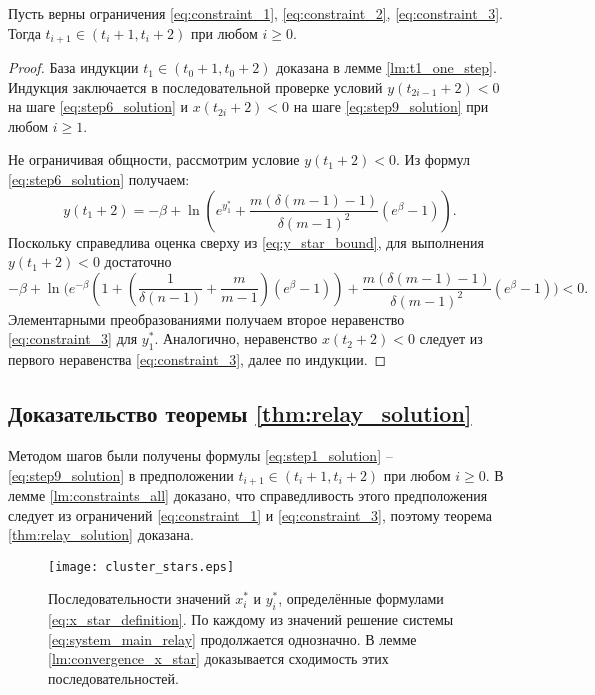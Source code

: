 \begin{lemma}
	\label{lm:constraints_all}
	Пусть верны ограничения \eqref{eq:constraint_1}, \eqref{eq:constraint_2}, \eqref{eq:constraint_3}. Тогда $t_{i + 1} \in (t_i + 1, t_i + 2)$ при любом $i \geqslant 0$.
\end{lemma}
\begin{proof}
	
	База индукции $t_1 \in (t_0 + 1, t_0 + 2)$ доказана в лемме \eqref{lm:t1_one_step}. Индукция заключается в последовательной проверке условий $y(t_{2i - 1} + 2) < 0$ на шаге \eqref{eq:step6_solution} и $x(t_{2i} + 2) < 0$ на шаге \eqref{eq:step9_solution} при любом $i \geqslant 1$.
	
	Не ограничивая общности, рассмотрим условие $y(t_1 + 2) < 0$. Из формул \eqref{eq:step6_solution} получаем:
	\[
	y(t_1 + 2) = -\beta + \ln\left(e^{y_1^*} + \frac{m(\delta(m - 1) - 1)}{\delta (m - 1)^2}(e^\beta - 1) \right).
	\]
	Поскольку справедлива оценка сверху из \eqref{eq:y_star_bound}, для выполнения $y(t_1 + 2) < 0$ достаточно
	\[
	-\beta + \ln\Bigg(e^{-\beta} \left(1 + \left( \dfrac{1}{\delta(n - 1)} + \dfrac{m}{m - 1} \right)(e^{\beta} - 1)\right) + \frac{m(\delta(m - 1) - 1)}{\delta (m - 1)^2} (e^\beta - 1) \Bigg) < 0.
	\]
	Элементарными преобразованиями получаем второе неравенство \eqref{eq:constraint_3} для $y_1^*$. Аналогично, неравенство $x(t_2 + 2) < 0$ следует из первого неравенства \eqref{eq:constraint_3}, далее по индукции.
\end{proof}

\subsection{Доказательство теоремы \ref{thm:relay_solution}} 
Методом шагов были получены формулы \eqref{eq:step1_solution} -- \eqref{eq:step9_solution} в предположении $t_{i + 1} \in (t_i + 1, t_i + 2)$ при любом $i \geqslant 0$. В лемме \ref{lm:constraints_all} доказано, что справедливость этого предположения следует из ограничений \eqref{eq:constraint_1} и \eqref{eq:constraint_3}, поэтому теорема \ref{thm:relay_solution} доказана.

\begin{figure}
	\centering
	\texttt{[image: cluster\_stars.eps]}
	\caption{Последовательности значений $x^*_i$ и $y^*_i$, определённые формулами \eqref{eq:x_star_definition}. По каждому из значений решение системы \eqref{eq:system_main_relay} продолжается однозначно. В лемме \ref{lm:convergence_x_star} доказывается сходимость этих последовательностей.}
	\label{fig:x_star}
\end{figure}

